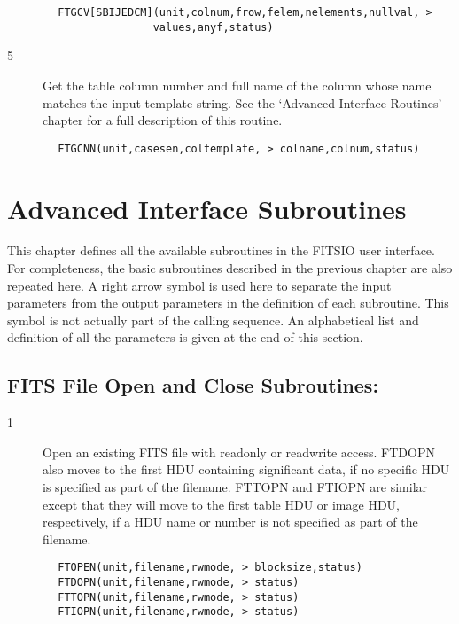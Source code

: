 \documentclass[11pt]{book}
\begin{document}
\begin{verbatim}
        FTGCV[SBIJEDCM](unit,colnum,frow,felem,nelements,nullval, >
                       values,anyf,status)
\end{verbatim}

\begin{description}
\item[5 ] Get the table column number and full name of the column whose name
    matches the input template string.  See the `Advanced Interface Routines'
   chapter for a full description of this routine.
\end{description}

\begin{verbatim}
        FTGCNN(unit,casesen,coltemplate, > colname,colnum,status)
\end{verbatim}


\chapter{   Advanced Interface Subroutines }

This chapter defines all the available subroutines in the FITSIO user
interface. For completeness, the basic subroutines described in the
previous chapter are also repeated here. A right arrow symbol is used
here to separate the input parameters from the output parameters in the
definition of each subroutine. This symbol is not actually part of the
calling sequence. An alphabetical list and definition of all the
parameters is given at the end of this section.


\section{FITS File Open and Close Subroutines: \label{FTOPEN}}


\begin{description}
\item[1 ]Open an existing FITS file with readonly or readwrite access. FTDOPN
also moves to the first HDU containing significant data, if no specific
HDU is specified as part of the filename.  FTTOPN and FTIOPN are similar
except that they will move to the first table HDU or image HDU, respectively,
if a HDU name or number is not specified as part of the filename.
\end{description}

\begin{verbatim}
        FTOPEN(unit,filename,rwmode, > blocksize,status)
        FTDOPN(unit,filename,rwmode, > status)
        FTTOPN(unit,filename,rwmode, > status)
        FTIOPN(unit,filename,rwmode, > status)
\end{verbatim}
\end{document}
